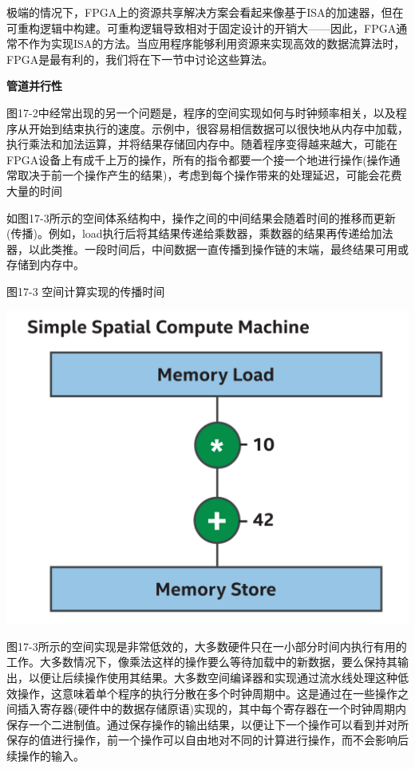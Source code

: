 极端的情况下，FPGA上的资源共享解决方案会看起来像基于ISA的加速器，但在可重构逻辑中构建。可重构逻辑导致相对于固定设计的开销大——因此，FPGA通常不作为实现ISA的方法。当应用程序能够利用资源来实现高效的数据流算法时，FPGA是最有利的，我们将在下一节中讨论这些算法。\par

\hspace*{\fill} \par %
\textbf{管道并行性}

图17-2中经常出现的另一个问题是，程序的空间实现如何与时钟频率相关，以及程序从开始到结束执行的速度。示例中，很容易相信数据可以很快地从内存中加载，执行乘法和加法运算，并将结果存储回内存中。随着程序变得越来越大，可能在FPGA设备上有成千上万的操作，所有的指令都要一个接一个地进行操作(操作通常取决于前一个操作产生的结果)，考虑到每个操作带来的处理延迟，可能会花费大量的时间\par

如图17-3所示的空间体系结构中，操作之间的中间结果会随着时间的推移而更新(传播)。例如，load执行后将其结果传递给乘数器，乘数器的结果再传递给加法器，以此类推。一段时间后，中间数据一直传播到操作链的末端，最终结果可用或存储到内存中。\par

\hspace*{\fill} \par %
图17-3 空间计算实现的传播时间
\begin{center}
	\includegraphics[width=1.0\textwidth]{content/chapter-17/images/3}
\end{center}

图17-3所示的空间实现是非常低效的，大多数硬件只在一小部分时间内执行有用的工作。大多数情况下，像乘法这样的操作要么等待加载中的新数据，要么保持其输出，以便让后续操作使用其结果。大多数空间编译器和实现通过流水线处理这种低效操作，这意味着单个程序的执行分散在多个时钟周期中。这是通过在一些操作之间插入寄存器(硬件中的数据存储原语)实现的，其中每个寄存器在一个时钟周期内保存一个二进制值。通过保存操作的输出结果，以便让下一个操作可以看到并对所保存的值进行操作，前一个操作可以自由地对不同的计算进行操作，而不会影响后续操作的输入。\par

